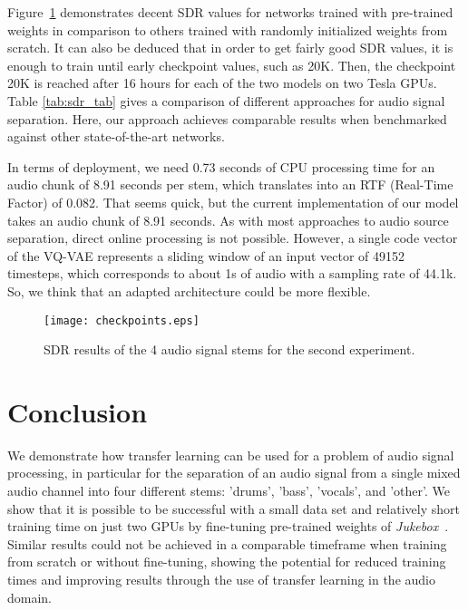\documentclass{llncs}
\begin{document}
Figure~\ref{fig:res_1} demonstrates decent SDR values for networks trained with  pre-trained weights in comparison to others trained with randomly initialized weights from scratch. It can also be deduced that in order to get fairly good SDR values, it is enough to train until early checkpoint values, such as 20K. Then, the checkpoint 20K is reached after 16 hours for each of the two models on two Tesla GPUs. Table \ref{tab:sdr_tab} gives a comparison of different approaches for audio signal separation. Here, our approach achieves comparable results when benchmarked against other state-of-the-art networks. 


In terms of deployment, we need 0.73 seconds of CPU processing time for an audio chunk of 8.91 seconds per stem, which translates into an RTF (Real-Time Factor) of 0.082. That seems quick, but the current implementation of our model takes an audio chunk of 8.91 seconds. As with most approaches to audio source separation, direct online processing is not possible. However, a single code vector of the VQ-VAE represents a sliding window of an input vector of 49152 timesteps, which corresponds to about 1s of audio with a sampling rate of 44.1k. So, we think that an adapted architecture could be more flexible.




\begin{figure}[htb]
\centering
 \texttt{[image: checkpoints.eps]}
 \caption{SDR results of the 4 audio signal stems for the second experiment.}
 \label{fig:res_1}
\end{figure}

\section{Conclusion}






We demonstrate how transfer learning can be used for a problem of audio signal processing, in particular for the separation of an audio signal from a single mixed audio channel into four different stems: 'drums', 'bass', 'vocals', and 'other'. We show that it is possible to be successful with a small data set and relatively short training time on just two GPUs by fine-tuning pre-trained weights of \textit{Jukebox}~\cite{dhariwal2020jukebox}. Similar results could not be achieved in a comparable timeframe when training from scratch or without fine-tuning, showing the potential for reduced training times and improving results through the use of transfer learning in the audio domain. 





\end{document}
